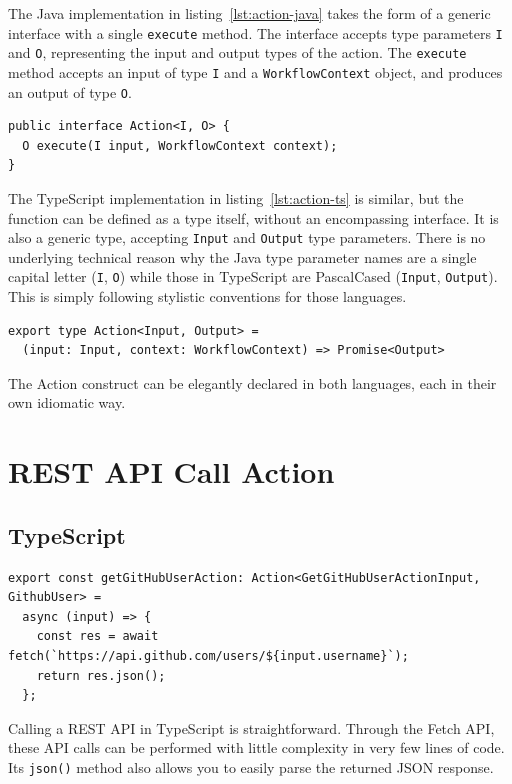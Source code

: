 The Java implementation in listing~\ref{lst:action-java} takes the form of a generic interface with a single \texttt{execute} method. The interface accepts type parameters \texttt{I} and \texttt{O}, representing the input and output types of the action. The \texttt{execute} method accepts an input of type \texttt{I} and a \texttt{WorkflowContext} object, and produces an output of type \texttt{O}.
\begin{listing}[H]
    \begin{verbatim}
public interface Action<I, O> {
  O execute(I input, WorkflowContext context);
}
    \end{verbatim}
    \caption{Action interface in Java}
    \label{lst:action-java}
\end{listing}

The TypeScript implementation in listing~\ref{lst:action-ts} is similar, but the function can be defined as a type itself, without an encompassing interface. It is also a generic type, accepting \texttt{Input} and \texttt{Output} type parameters. There is no underlying technical reason why the Java type parameter names are a single capital letter (\texttt{I}, \texttt{O}) while those in TypeScript are PascalCased (\texttt{Input}, \texttt{Output}). This is simply following stylistic conventions for those languages.
\begin{listing}[H]
    \begin{verbatim}
export type Action<Input, Output> = 
  (input: Input, context: WorkflowContext) => Promise<Output>
    \end{verbatim}
    \caption{Action type in TypeScript}
    \label{lst:action-ts}
\end{listing}
The Action construct can be elegantly declared in both languages, each in their own idiomatic way.

\pagebreak
\section{REST API Call Action}
\subsection{TypeScript}
\begin{listing}[h]
    \begin{verbatim}
export const getGitHubUserAction: Action<GetGitHubUserActionInput, GithubUser> = 
  async (input) => {
    const res = await fetch(`https://api.github.com/users/${input.username}`);
    return res.json();
  };
    \end{verbatim}
    \caption{REST API call in TypeScript}
\end{listing}
Calling a REST API in TypeScript is straightforward. Through the Fetch API, these API calls can be performed with little complexity in very few lines of code. Its \texttt{json()} method also allows you to easily parse the returned JSON response.

